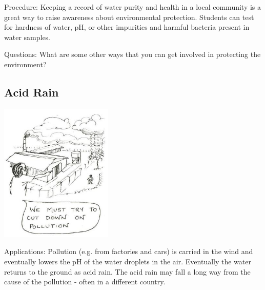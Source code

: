 \begin{multicols}{2}
\begin{description*}
\item[Procedure:]{Keeping a record of water purity and health in a local community is a great way to raise awareness about environmental protection. Students can test for hardness of water, pH, or other impurities and harmful bacteria present in water samples.}
\item[Questions:]{What are some other ways that you can get involved in protecting the environment?}
\end{description*}

\subsection{Acid Rain}

\begin{center}
\includegraphics[width=0.4\textwidth]{./img/source/acid-rain.jpg}
\end{center}

\begin{description*}
\item[Applications:]{Pollution (e.g. from factories and cars) is carried in the wind and eventually lowers the pH of the water droplets in the air. Eventually the water returns to the ground as acid rain. The acid rain may fall a long way from the cause of the pollution - often in a different country.}
\end{description*}


\end{multicols}
